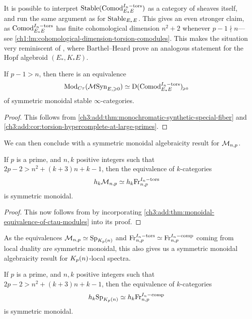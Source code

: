 \begin{remark}
    It is possible to interpret $\mathrm{Stable}(\mathrm{Comod}_{E_*E}^{I_n-\mathrm{tors}})$ as a category of sheaves itself, and run the same argument as for $\mathrm{Stable}_{E_*E}$. This gives an even stronger claim, as $\mathrm{Comod}_{E_*E}^{I_n-\mathrm{tors}}$ has finite cohomological dimension $n^2+2$ whenever $p-1\nmid n$---see \cref{ch1:lm:cohomological-dimension-torsion-comodules}. This makes the situation very reminiscent of \cite[4.7]{barthel-heard_2018}, where Barthel--Heard prove an analogous statement for the Hopf algebroid $(E_*, K_*E)$. 
\end{remark}

\begin{theorem}
    \label{ch3:add:thm:monoidal-equivalence-of-ctau-modules}
    If $p-1>n$, then there is an equivalence 
    \[\mathrm{Mod}_{C\tau}(\mathcal{M}\mathrm{Syn}_{E, \geqslant 0}) \simeq \mathrm{D}(\mathrm{Comod}_{E_*E}^{I_n-\mathrm{tors}})_{\hspace{-1pt}\scriptscriptstyle\geqslant 0}\]
    of symmetric monoidal stable $\infty$-categories. 
\end{theorem}
\begin{proof}
    This follows from \cref{ch3:add:thm:monochromatic-synthetic-special-fiber} and \cref{ch3:add:cor:torsion-hypercomplete-at-large-primes}. 
\end{proof}

We can then conclude with a symmetric monoidal algebraicity result for $\mathcal{M}_{n,p}$. 

\begin{theorem}
    \label{ch3:add:thm:monochromatic-monoidally-algebraic}
    If $p$ is a prime, and $n, k$ positive integers such that $2p-2>n^2+(k+3)n+k-1$, then the equivalence of $k$-categories
    \[h_k \mathcal{M}_{n,p}\simeq h_k \mathrm{Fr}_{n,p}^{I_n-\mathrm{tors}}\]
    is symmetric monoidal. 
\end{theorem}
\begin{proof}
    This now follows from \cite[Theorem H]{barkan_2023} by incorporating \cref{ch3:add:thm:monoidal-equivalence-of-ctau-modules} into its proof. 
\end{proof}


As the equivalences $\mathcal{M}_{n,p} \simeq \mathrm{Sp}_{K_p(n)}$ and $\mathrm{Fr}_{n,p}^{I_n-\mathrm{tors}} \simeq \mathrm{Fr}_{n,p}^{I_n-\mathrm{comp}}$ coming from local duality are symmetric monoidal, this also gives us a symmetric monoidal algebraicity result for ${K_p(n)}$-local spectra. 

\begin{corollary}
    If $p$ is a prime, and $n, k$ positive integers such that $2p-2>n^2+(k+3)n+k-1$, then the equivalence of $k$-categories
    \[h_k \mathrm{Sp}_{K_p(n)}\simeq h_k \mathrm{Fr}_{n,p}^{I_n-\mathrm{comp}}\]
    is symmetric monoidal. 
\end{corollary}
